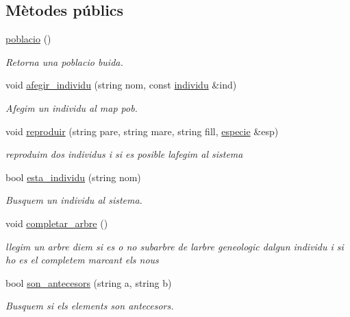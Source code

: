 \subsection*{Mètodes públics}
\begin{DoxyCompactItemize}
\item 
\hyperlink{classpoblacio_a8d6ad7ce285dd47c9cfd806e302d7086}{poblacio} ()
\begin{DoxyCompactList}\small\item\em Retorna una poblacio buida. \end{DoxyCompactList}\item 
void \hyperlink{classpoblacio_a09a516141a9a8bef9249239916894af5}{afegir\+\_\+individu} (string nom, const \hyperlink{classindividu}{individu} \&ind)
\begin{DoxyCompactList}\small\item\em Afegim un individu al map pob. \end{DoxyCompactList}\item 
void \hyperlink{classpoblacio_a347bc063088e161813c257211d8059b9}{reproduir} (string pare, string mare, string fill, \hyperlink{classespecie}{especie} \&esp)
\begin{DoxyCompactList}\small\item\em reproduim dos individus i si es posible l\textquotesingle{}afegim al sistema \end{DoxyCompactList}\item 
bool \hyperlink{classpoblacio_a9c6fe58f2cbd06574070df2ef4076015}{esta\+\_\+individu} (string nom)
\begin{DoxyCompactList}\small\item\em Busquem un individu al sistema. \end{DoxyCompactList}\item 
void \hyperlink{classpoblacio_a1e30be9019dcb194171228c41284117f}{completar\+\_\+arbre} ()
\begin{DoxyCompactList}\small\item\em llegim un arbre diem si es o no subarbre de l\textquotesingle{}arbre geneologic d\textquotesingle{}algun individu i si ho es el completem marcant els nous \end{DoxyCompactList}\item 
bool \hyperlink{classpoblacio_a0002a245d187017cf1af34b364c176a0}{son\+\_\+antecesors} (string a, string b)
\begin{DoxyCompactList}\small\item\em Busquem si els elements son antecesors. \end{DoxyCompactList}\item 

\end{DoxyCompactItemize}

